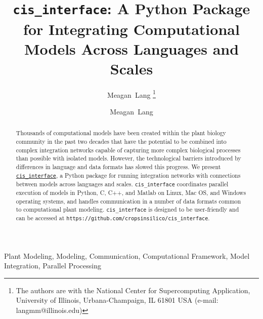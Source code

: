 \documentclass[journal]{IEEEtran}
\newcommand{\cis}{{\tt cis\_interface}{}}
\begin{document}
\ifieee
\else
	\shorttitle{{\cis}}
\fi

\title{{\cis}: A Python Package for Integrating Computational Models Across Languages and Scales}

\ifieee
	\author{Meagan~Lang%
	\thanks{The authors are with the National Center for Supercomputing Application, University of Illinois, Urbana-Champaign, IL 61801 USA (e-mail: langmm@illinois.edu)}}
\else
	\author{Meagan~Lang}

\fi


\ifieee
	\maketitle
\fi

\begin{abstract}
Thousands of computational models have been created within the plant biology community in the past two decades that have the potential to be combined into complex integration networks capable of capturing more complex biological processes than possible with isolated models. However, the technological barriers introduced by differences in language and data formats has slowed this progress. We present \href{https://github.com/cropsinsilico/cis_interface}{\cis}, a Python package for running integration networks with connections between models across languages and scales. {\cis} coordinates parallel execution of models in Python, C, C++, and Matlab on Linux, Mac OS, and Windows operating systems, and handles communication in a number of data formats common to computational plant modeling. {\cis} is designed to be user-friendly and can be accessed at {\tt https://github.com/cropsinsilico/cis\_interface}.
\end{abstract}

\ifieee
	\begin{IEEEkeywords}
		Plant Modeling, Modeling, Communication, Computational Framework, Model Integration, Parallel Processing
	\end{IEEEkeywords}
	\IEEEpeerreviewmaketitle
\else
	\maketitle
\fi

\end{document}
